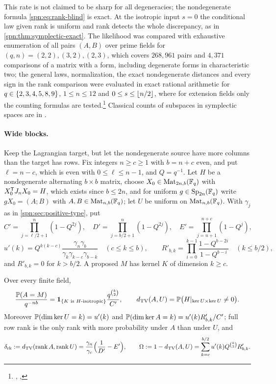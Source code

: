 This rate is not claimed to be sharp for all degeneracies; the nondegenerate formula
\eqref{spn:eq:rank-blind} is exact. At the isotropic input $s=0$ the conditional law given
rank is uniform and rank detects the whole discrepancy, as in
\cref{spn:thm:symplectic-exact}. The likelihood was compared with exhaustive enumeration of all pairs $(A,B)$
over prime fields for $(q,n)=(2,2),(3,2),(2,3)$, which covers $268{,}961$ pairs and $4{,}371$
comparisons of a matrix with a form, including degenerate forms in characteristic two; the
general laws, normalization, the exact nondegenerate distances and every sign in the rank
comparison were evaluated in exact rational arithmetic for $q\in\{2,3,4,5,8,9\}$,
$1\le n\le12$ and $0\le s\le\lfloor n/2\rfloor$, where for extension fields only the counting
formulas are
tested.\footnote{\raggedright{},
,
}
Classical counts of subspaces in symplectic spaces are in
\cite{Wan1993Anzahl,GuoLiWang2013Anzahl}.

\paragraph{Wide blocks.}
Keep the Lagrangian target, but let the nondegenerate source have more columns than the target has
rows. Fix integers $n\ge c\ge1$ with $b=n+c$ even, and put $\ell=n-c$, which is even with
$0\le\ell\le n-1$, and $Q=q^{-1}$. Let $H$ be a nondegenerate alternating $b\times b$ matrix, choose
$X_0\in\operatorname{Mat}_{2n,b}(\mathbb{F}_q)$ with $X_0^{\mathsf{T}}J_nX_0=H$, which exists since $b\le2n$, and for uniform
$g\in\operatorname{Sp}_{2n}(\mathbb{F}_q)$ write $gX_0=(A;B)$ with $A,B\in\operatorname{Mat}_{n,b}(\mathbb{F}_q)$; let $U$ be uniform on
$\operatorname{Mat}_{n,b}(\mathbb{F}_q)$. With $\gamma_j$ as in \cref{spn:sec:positive-type}, put
\[
 C'=\prod_{j=\ell/2+1}^{n}(1-Q^{2j}),\quad D'=\prod_{j=b/2+1}^{n}(1-Q^{2j}),\quad
 E'=\prod_{j=n+1}^{n+c}(1-Q^j),
\]
\[
 u'(k)=Q^{k(k-c)}\frac{\gamma_n\gamma_b}{\gamma_k\gamma_{k-c}\gamma_{b-k}}\quad(c\le k\le b),\qquad
 R'_{b,k}=\prod_{i=0}^{k-1}\frac{1-Q^{b-2i}}{1-Q^{b-i}}\quad(k\le b/2),
\]
and $R'_{b,k}=0$ for $k>b/2$. A proposed $M$ has kernel $K$ of dimension $k\ge c$.

\begin{theorem}\label{spn:thm:wide}
Over every finite field,
\[
 \frac{\mathbb{P}(A=M)}{q^{-nb}}=\mathbf 1_{\{K\text{ is $H$-isotropic}\}}\frac{q^{\binom k2}}{C'},\qquad
 d_{\mathrm{TV}}(A,U)=\mathbb{P}\bigl(H|_{\ker U\times\ker U}\ne0\bigr).
\]
Moreover $\mathbb{P}(\dim\ker U=k)=u'(k)$ and $\mathbb{P}(\dim\ker A=k)=u'(k)R'_{b,k}/C'$; full row rank is the
only rank with more probability under $A$ than under $U$, and
\[
 \delta_{\mathrm{rk}}:=d_{\mathrm{TV}}(\operatorname{rank} A,\operatorname{rank} U)=\frac{\gamma_n}{\gamma_c}\Bigl(\frac1{D'}-E'\Bigr),\qquad
 \Omega:=1-d_{\mathrm{TV}}(A,U)=\sum_{k=c}^{b/2}u'(k)Q^{\binom k2}R'_{b,k}.
\]
\end{theorem}

